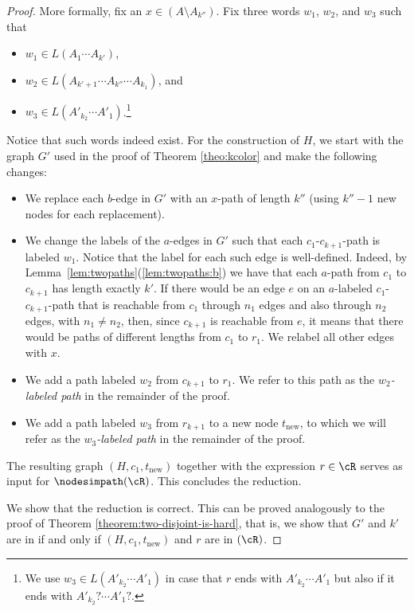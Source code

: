 \documentclass[a4paper,english]{lipics-v2016}
\theoremstyle{plain}
\begin{document}
\begin{proof}
  More formally, fix an $x \in (A \setminus A_{k''})$. Fix three words
  $w_1$, $w_2$, and $w_3$ such that
  \begin{itemize}
  \item $w_1 \in L(A_1 \cdots A_{k'})$,
  \item $w_2 \in L(A_{k'+1} \cdots  A_{k''} \cdots
    A_{k_1})$, and
  \item $w_3 \in L(A'_{k_2} \cdots A'_1)$.\footnote{We use $w_3 \in
      L(A'_{k_2} \cdots A'_1)$ in case that $r$ ends with $A'_{k_2}
      \cdots A'_1$ but also if it ends with $A'_{k_2}? \cdots A'_1?$.}
  \end{itemize}
  Notice that such words indeed exist.  For the construction of $H$,
  we start with the graph $G'$ used in the proof of Theorem
  \ref{theo:kcolor} and make the following changes:
  \begin{itemize}
  \item We replace each $b$-edge in $G'$ with an $x$-path of length $k''$
    (using $k''-1$ new nodes for each replacement).
  \item We change the labels of the $a$-edges in $G'$ such that each
    $c_1$-$c_{k+1}$-path is labeled $w_1$. Notice that the label for each
    such edge is well-defined. Indeed, by
    Lemma~\ref{lem:twopaths}(\ref{lem:twopaths:b}) we have that 
    each $a$-path from $c_1$ to $c_{k+1}$ has length exactly $k'$.  
                If there would be an edge
    $e$ on an $a$-labeled $c_1$-$c_{k+1}$-path that is reachable from $c_1$ through
    $n_1$ edges and also through $n_2$ edges, with $n_1 \neq n_2$,
    then, since $c_{k+1}$ is reachable from $e$, it means that there would
    be paths of different lengths from $c_1$ to $r_1$.
    We relabel all other edges with $x$.
          \item We add a path labeled $w_2$ from $c_{k+1}$ to
    $r_1$. We refer to this path as the \emph{$w_2$-labeled path} in
    the remainder of the proof.
          \item We add a path labeled $w_3$     from $r_{k+1}$ to a new node $t_\text{new}$, 
            to which we will refer as the
    \emph{$w_3$-labeled path} in the remainder of the proof.
      \end{itemize} 
  The resulting graph $(H,c_1,t_\text{new})$ together with the expression $r \in
  \cR$ serves as input for $\nodesimpath(\cR)$. This concludes the reduction.

  
  We show that the reduction is correct. This can be proved analogously 
  to the proof of Theorem \ref{theorem:two-disjoint-is-hard}, that is,
  we show that $G'$ and $k'$ are in \knodecolordisjointpaths if and only if
  $(H,c_1,t_\text{new})$ and $r$ are in \nodesimpath$(\cR)$.


\end{proof}
\end{document}
